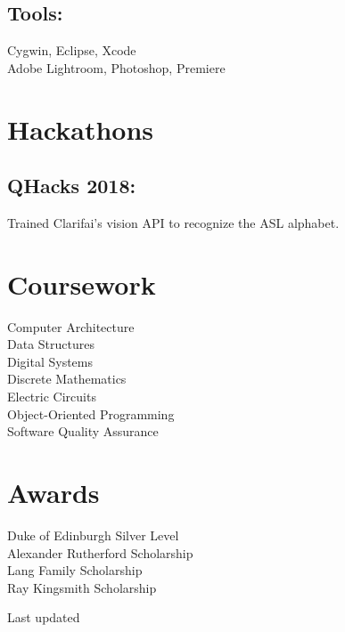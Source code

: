 \documentclass[]{hieudo-build}
\begin{document}
\begin{minipage}[t]{0.34\textwidth}
\subsection{Tools:}
Cygwin, Eclipse, Xcode\\
Adobe Lightroom, Photoshop, Premiere \\ 

\sectionsep

\section{Hackathons}
\subsection{QHacks 2018:}
Trained Clarifai's vision API to recognize the ASL alphabet.
\sectionsep


\section{Coursework}
Computer Architecture \\
Data Structures \\
Digital Systems \\
Discrete Mathematics \\
Electric Circuits \\
Object-Oriented Programming\\
Software Quality Assurance\\
\sectionsep

\section{Awards}
Duke of Edinburgh Silver Level\\
Alexander Rutherford Scholarship \\
Lang Family Scholarship \\
Ray Kingsmith Scholarship \\
\sectionsep

\sectionsep
{}
Last updated 

%
%
\end{minipage} 
\end{document}

